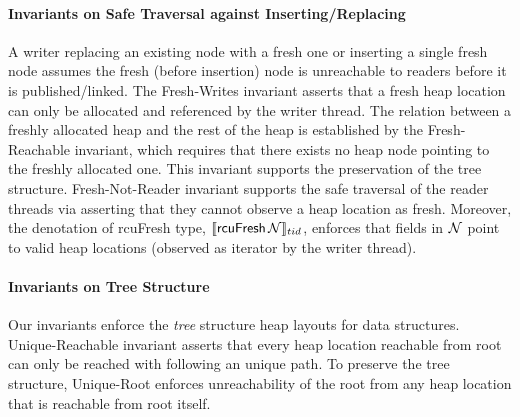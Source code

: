 \paragraph{Invariants on Safe Traversal against Inserting/Replacing} A writer {replacing an existing node with a fresh one} or {inserting a single fresh node} assumes the fresh (before insertion) node is unreachable to readers before it is published/linked.
The \textsf{Fresh-Writes} invariant asserts that a fresh heap location can only be allocated and referenced by the writer thread. The relation between a freshly allocated heap and the rest of the heap is established by the \textsf{Fresh-Reachable} invariant, which requires that there exists no heap node pointing to the freshly allocated one. This invariant supports the preservation of the tree structure. \textsf{Fresh-Not-Reader} invariant supports the safe traversal of the reader threads via asserting that they cannot observe a heap location as \textsf{fresh}. 
Moreover, the denotation of \textsf{rcuFresh} type, $\llbracket \mathsf{rcuFresh}\,\mathcal{N} \rrbracket_{tid}$, enforces that fields in $\mathcal{N}$ point to valid heap locations (observed as \textsf{iterator} by the writer thread).
\paragraph{Invariants on Tree Structure} Our invariants enforce the \textit{tree} structure heap layouts for data structures. \textsf{Unique-Reachable} invariant asserts that every heap location reachable from root can only be reached with following an unique path. To preserve the tree structure, \textsf{Unique-Root} enforces unreachability of the root from any heap location that is reachable from root itself. 

